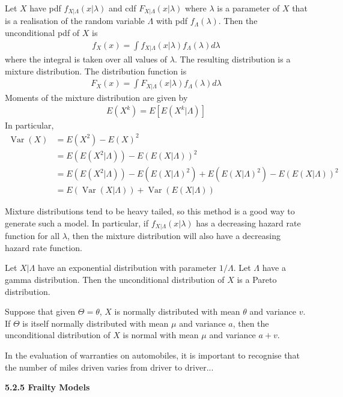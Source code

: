 \documentclass[hidelinks, 12pt]{article}
\DeclareMathOperator{\Var}{Var}
\theoremstyle{mydefstyle}
\theoremstyle{mythmstyle}
\begin{document}
Let $X$ have pdf $f_{X\vert\Lambda}(x\vert\lambda)$ and cdf $F_{X\vert\Lambda}(x\vert\lambda)$ where $\lambda$ is a parameter of $X$ that is a realisation of the random variable $\Lambda$ with pdf $f_{\Lambda}(\lambda)$. Then the unconditional pdf of $X$ is
\begin{gather*}
f_X(x) = \int f_{X\vert\Lambda}(x\vert\lambda) f_{\Lambda}(\lambda) d\lambda \tag{5.2}
\end{gather*}
where the integral is taken over all values of $\lambda$. The resulting distribution is a mixture distribution. The distribution function is
\begin{gather*}
F_X(x) = \int F_{X\vert\Lambda}(x\vert\lambda) f_{\Lambda}(\lambda) d\lambda
\end{gather*}
Moments of the mixture distribution are given by
\begin{gather*}
E(X^k) = E[E(X^k \vert \Lambda)]
\end{gather*}
In particular,
\begin{align*}
\Var(X) 
&= E(X^2) - E(X)^2 \\
&= E(E(X^2\vert\Lambda)) - E(E(X\vert\Lambda))^2 \\
&= E(E(X^2\vert\Lambda)) - E(E(X\vert\Lambda)^2) + E(E(X\vert\Lambda)^2) - E(E(X\vert\Lambda))^2 \\
&= E(\Var(X\vert\Lambda)) + \Var(E(X\vert\Lambda))
\end{align*}

Mixture distributions tend to be heavy tailed, so this method is a good way to generate such a model. In particular, if $f_{X\vert\Lambda}(x\vert\lambda)$ has a decreasing hazard rate function for all $\lambda$, then the mixture distribution will also have a decreasing hazard rate function. 

Let $X\vert\Lambda$ have an exponential distribution with parameter $1/\Lambda$. Let $\Lambda$ have a gamma distribution. Then the unconditional distribution of $X$ is a Pareto distribution.

Suppose that given $\Theta = \theta$, $X$ is normally distributed with mean $\theta$ and variance $v$. If $\Theta$ is itself normally distributed with mean $\mu$ and variance $a$, then the unconditional distribution of $X$ is normal with mean $\mu$ and variance $a+v$.

In the evaluation of warranties on automobiles, it is important to recognise that the number of miles driven varies from driver to driver...

\textbf{5.2.5 Frailty Models}
\end{document}
